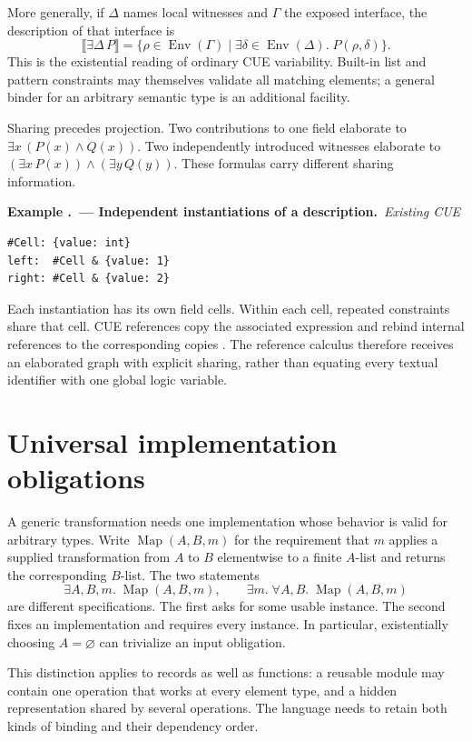 \documentclass[11pt,a4paper,oneside]{report}
\newcommand{\sem}[1]{\llbracket #1\rrbracket}
\newcommand{\Env}{\operatorname{Env}}
\theoremstyle{remark}
\newcounter{example}[chapter]
\renewcommand{\theexample}{\thechapter.\arabic{example}}
\newcommand{\example}[2]{\refstepcounter{example}\Needspace{5\baselineskip}\par\textbf{Example \theexample\ --- #1.}\ \textit{#2}\par\nopagebreak[4]}
\begin{document}
More generally, if $\Delta$ names local witnesses and $\Gamma$ the exposed
interface, the description of that interface is
\[
 \sem{\exists\Delta\,P}
 =\{\rho\in\Env(\Gamma)\mid
       \exists\delta\in\Env(\Delta).\;P(\rho,\delta)\}.
\]
This is the existential reading of ordinary CUE variability. Built-in list and
pattern constraints may themselves validate all matching elements; a general
binder for an arbitrary semantic type is an additional facility.

Sharing precedes projection. Two contributions to one field elaborate to
$\exists x\,(P(x)\land Q(x))$. Two independently introduced witnesses elaborate
to $(\exists x\,P(x))\land(\exists y\,Q(y))$. These formulas carry different
sharing information.

\example{Independent instantiations of a description}{Existing CUE}
\par\noindent\begin{minipage}{\linewidth}
\begin{lstlisting}
#Cell: {value: int}
left:  #Cell & {value: 1}
right: #Cell & {value: 2}
\end{lstlisting}
\end{minipage}\par
Each instantiation has its own field cells. Within each cell, repeated
constraints share that cell. CUE references copy the associated expression and
rebind internal references to the corresponding copies \cite{cuerefs}.
The reference calculus therefore receives an elaborated graph with explicit
sharing, rather than equating every textual identifier with one global logic
variable.

\section{Universal implementation obligations}
A generic transformation needs one implementation whose behavior is valid for
arbitrary types. Write $\operatorname{Map}(A,B,m)$ for the requirement that $m$
applies a supplied transformation from $A$ to $B$ elementwise to a finite
$A$-list and returns the corresponding $B$-list. The two statements
\[
 \exists A,B,m.\;\operatorname{Map}(A,B,m),\qquad
 \exists m.\;\forall A,B.\;\operatorname{Map}(A,B,m)
\]
are different specifications. The first asks for some usable instance. The
second fixes an implementation and requires every instance. In particular,
existentially choosing $A=\varnothing$ can trivialize an input obligation.

This distinction applies to records as well as functions: a reusable module may
contain one operation that works at every element type, and a hidden
representation shared by several operations. The language needs to retain both
kinds of binding and their dependency order.
\end{document}
